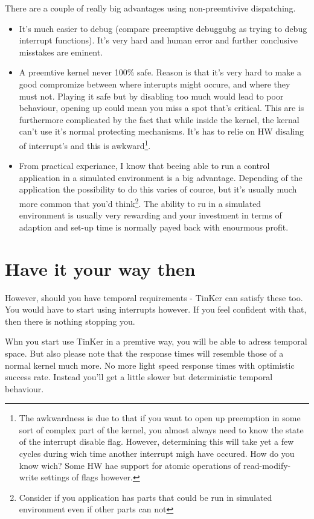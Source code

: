 There are a couple of really big advantages using non-preemtivive dispatching.
\begin{itemize}
	\item It's much easier to debug (compare preemptive debuggubg as trying to debug interrupt functions). It's very hard and human error and further conclusive misstakes are eminent.
	\item A preemtive kernel never 100\% safe. Reason is that it's very hard to make a good compromize between where interupts might occure, and where they must not. Playing it safe but by disabling too much would lead to poor behaviour, opening up could mean you miss a spot that's critical. This are is furthermore complicated by the fact that while inside the kernel, the kernal can't use it's normal protecting mechanisms. It's has to relie on HW disaling of interrupt's and this is awkward\footnote{The awkwardness is due to that if you want to open up preemption in some sort of complex part of the kernel, you almost always need to know the state of the interrupt disable flag. However, determining this will take yet a few cycles during wich time another interrupt migh have occured. How do you know wich? Some HW hae support for atomic operations of read-modify-write settings of flags however.}.
	\item From practical experiance, I know that beeing able to run a control application in a simulated environment is a big advantage. Depending of the application the possibility to do this varies of cource, but it's usually much more common that you'd think\footnote{Consider if you application has parts that could be run in simulated environment even if other parts can not}. The ability to ru in a simulated environment is usually very rewarding and your investment in terms of adaption and set-up time is normally payed back with enourmous profit.
\end{itemize}

\section{Have it your way then}
However, should you have temporal requirements - TinKer can satisfy these too. You would have to start using interrupts however. If you feel confident with that, then there is nothing stopping you.

Whn you start use TinKer in a premtive way, you will be able to adress temporal space. But also please note that the response times will resemble those of a normal kernel much more. No more light speed response times with optimistic success rate. Instead you'll get a little slower but deterministic temporal behaviour.

